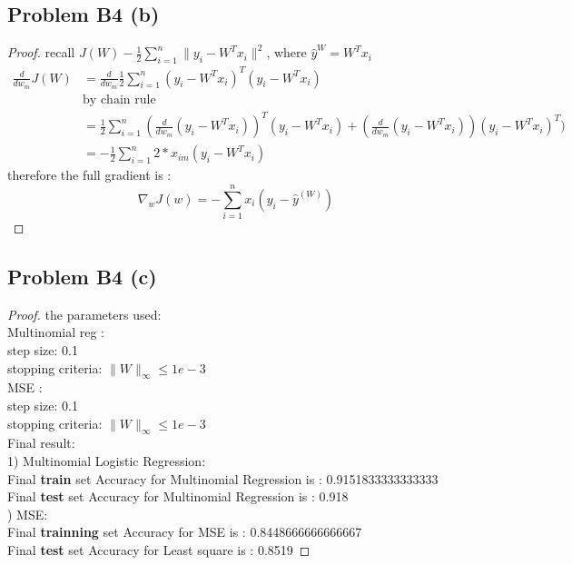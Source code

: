\documentclass[12pt]{article}
\begin{document}
 \newpage
 \subsection*{Problem B4 (b)}
 \begin{proof}
         recall $J(W) - \frac{1}{2} \sum_{i=1}^{n} \|y_i - W^Tx_i\|^2$, where $\widehat{y}^{W} = W^Tx_i $ \\ 
         \[
\begin{aligned}
        \frac{d}{dw_m} J(W) &= \frac{d}{d{w_m}} \frac{1}{2} \sum_{i=1}^{n} (y_i - W^Tx_i)^T  (y_i - W^Tx_i)\\
                            &\text{by chain rule}\\
                            & = \frac{1}{2} \sum_{i=1}^{n} (\frac{d}{dw_m}(y_i - W^Tx_i))^T  (y_i - W^Tx_i) + (\frac{d}{dw_m}(y_i - W^Tx_i))  (y_i - W^Tx_i)^T)\\
                            & = -\frac{1}{2} \sum_{i=1}^{n} 2 * x_{im} (y_i - W^Tx_i)
\end{aligned}
                 \]
                therefore the full gradient is : \\ 
$$\nabla_w J(w) = -\sum_{i=1}^{n} x_i(y_i - \widehat{y}^{(W)}) $$
 \end{proof}
\newpage
 \subsection*{Problem B4 (c)}
\begin{proof}
        the parameters used: \\

    \noindent    Multinomial reg :\\ step size: 0.1\\ stopping criteria: $\|W\|_{\infty} \leq 1e-3$\\

        \noindent         MSE  :\\ step size: 0.1\\ stopping criteria: $\|W\|_{\infty} \leq 1e-3$\\


       \noindent  Final result: \\
        1) Multinomial Logistic Regression: \\

        Final \textbf{train} set  Accuracy for Multinomial Regression is : 0.9151833333333333 \\

Final \textbf{test} set Accuracy for Multinomial Regression is : 0.918\\


) MSE: \\

Final \textbf{trainning} set Accuracy for MSE is : 0.8448666666666667\\

Final \textbf{test} set Accuracy for Least square is : 0.8519
\end{proof} 

 
 
\end{document}
